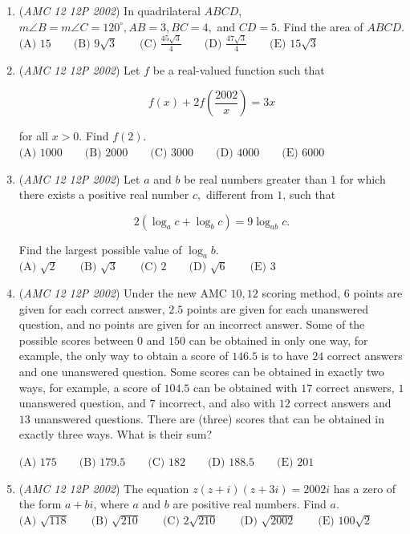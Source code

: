\begin{enumerate}
	\item (\textit{AMC 12 12P 2002}) In quadrilateral $ABCD$, $m\angle B = m \angle C = 120^{\circ}, AB=3, BC=4,$ and $CD=5.$ Find the area of $ABCD.$
$\text{(A) }15 \qquad \text{(B) }9 \sqrt{3} \qquad \text{(C) }\frac{45 \sqrt{3}}{4} \qquad \text{(D) }\frac{47 \sqrt{3}}{4} \qquad \text{(E) }15 \sqrt{3}$


	\item (\textit{AMC 12 12P 2002}) Let $f$ be a real-valued function such that


 
 \[f(x) + 2f(\frac{2002}{x}) = 3x\]


 for all $x>0.$ Find $f(2).$
$\text{(A) }1000 \qquad \text{(B) }2000 \qquad \text{(C) }3000 \qquad \text{(D) }4000 \qquad \text{(E) }6000$


	\item (\textit{AMC 12 12P 2002}) Let $a$ and $b$ be real numbers greater than $1$ for which there exists a positive real number $c,$ different from $1$, such that


 
 \[2(\log_a{c} + \log_b{c}) = 9\log_{ab}{c}.\]


 Find the largest possible value of $\log_a b.$
$\text{(A) }\sqrt{2} \qquad \text{(B) }\sqrt{3} \qquad \text{(C) }2 \qquad \text{(D) }\sqrt{6} \qquad \text{(E) }3$


	\item (\textit{AMC 12 12P 2002}) Under the new AMC $10, 12$ scoring method, $6$ points are given for each correct answer, $2.5$ points are given for each unanswered question, and no points are given for an incorrect answer. Some of the possible scores between $0$ and $150$ can be obtained in only one way, for example, the only way to obtain a score of $146.5$ is to have $24$ correct answers and one unanswered question. Some scores can be obtained in exactly two ways, for example, a score of $104.5$ can be obtained with $17$ correct answers, $1$ unanswered question, and $7$ incorrect, and also with $12$ correct answers and $13$ unanswered questions. There are (three) scores that can be obtained in exactly three ways. What is their sum?


 $\text{(A) }175 \qquad \text{(B) }179.5 \qquad \text{(C) }182 \qquad \text{(D) }188.5 \qquad \text{(E) }201$


	\item (\textit{AMC 12 12P 2002}) The equation $z(z+i)(z+3i)=2002i$ has a zero of the form $a+bi$, where $a$ and $b$ are positive real numbers. Find $a.$
$\text{(A) }\sqrt{118} \qquad \text{(B) }\sqrt{210} \qquad \text{(C) }2 \sqrt{210} \qquad \text{(D) }\sqrt{2002} \qquad \text{(E) }100 \sqrt{2}$



\end{enumerate}
